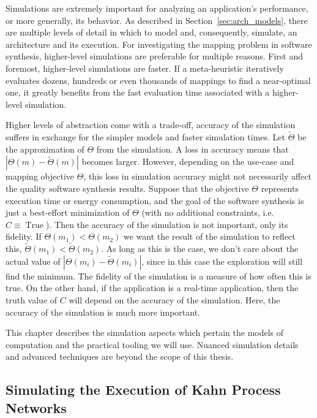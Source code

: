Simulations are extremely important for analyzing an application's performance, or more generally, its behavior.
As described in Section~\ref{sec:arch_models}, there are multiple levels of detail in which to model and, consequently, simulate, an architecture and its execution.
For investigating the mapping problem in software synthesis, higher-level simulations are preferable for multiple reasons.
First and foremost, higher-level simulations are faster.
If a meta-heuristic iteratively evaluates dozens, hundreds or even thousands of mappings to find a near-optimal one, it greatly benefits from the fast evaluation time associated with a higher-level simulation.

Higher levels of abstraction come with a trade-off, accuracy of the simulation suffers in exchange for the simpler models and faster simulation times.
Let $\tilde \Theta$ be the approximation of $\Theta$ from the simulation. A loss in accuracy means that $| \Theta(m) - \tilde \Theta(m)|$ becomes larger.
However, depending on the use-case and mapping objective $\Theta$, this loss in simulation accuracy might not necessarily affect the quality software synthesis results.
Suppose that the objective $\Theta$ represents execution time or energy consumption, and the goal of the software synthesis is just a best-effort minimization of $\Theta$ (with no additional constraints, i.e. $C \equiv \operatorname{True}$).
Then the accuracy of the simulation is not important, only its fidelity.
If $\Theta(m_1) < \Theta(m_2)$ we want the result of the simulation to reflect this, $\tilde \Theta(m_1) < \tilde \Theta(m_2)$.
As long as this is the case, we don't care about the actual value of $| \Theta(m_i) - \tilde \Theta(m_i)|$, since in this case the exploration will still find the minimum.
The fidelity of the simulation is a measure of how often this is true.
On the other hand, if the application is a real-time application, then the truth value of $C$ will depend on the accuracy of the simulation.
Here, the accuracy of the simulation is much more important.

This chapter describes the simulation aspects which pertain the models of computation and the practical tooling we will use.
Nuanced simulation details and advanced techniques are beyond the scope of this thesis.

\subsection{Simulating the Execution of Kahn Process Networks}


